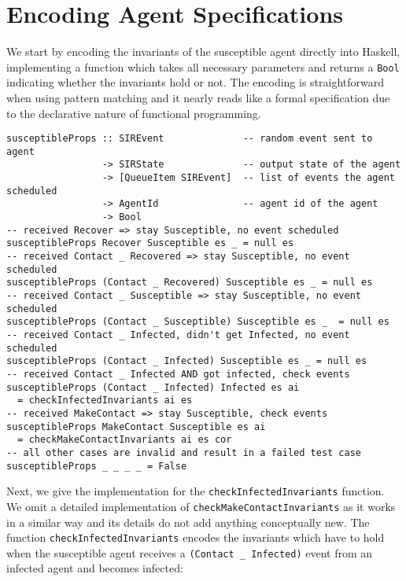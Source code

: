 \section{Encoding Agent Specifications}
\label{sec:method}
We start by encoding the invariants of the susceptible agent directly into Haskell, implementing a function which takes all necessary parameters and returns a \texttt{Bool} indicating whether the invariants hold or not. The encoding is straightforward when using pattern matching and it nearly reads like a formal specification due to the declarative nature of functional programming.

\begin{footnotesize}
\begin{verbatim}
susceptibleProps :: SIREvent              -- random event sent to agent
                 -> SIRState              -- output state of the agent
                 -> [QueueItem SIREvent]  -- list of events the agent scheduled
                 -> AgentId               -- agent id of the agent
                 -> Bool
-- received Recover => stay Susceptible, no event scheduled
susceptibleProps Recover Susceptible es _ = null es
-- received Contact _ Recovered => stay Susceptible, no event scheduled
susceptibleProps (Contact _ Recovered) Susceptible es _ = null es
-- received Contact _ Susceptible => stay Susceptible, no event scheduled
susceptibleProps (Contact _ Susceptible) Susceptible es _  = null es
-- received Contact _ Infected, didn't get Infected, no event scheduled
susceptibleProps (Contact _ Infected) Susceptible es _ = null es
-- received Contact _ Infected AND got infected, check events
susceptibleProps (Contact _ Infected) Infected es ai
  = checkInfectedInvariants ai es
-- received MakeContact => stay Susceptible, check events
susceptibleProps MakeContact Susceptible es ai
  = checkMakeContactInvariants ai es cor
-- all other cases are invalid and result in a failed test case
susceptibleProps _ _ _ _ = False
\end{verbatim}
\end{footnotesize}

Next, we give the implementation for the \texttt{checkInfectedInvariants} function. We omit a detailed implementation of \texttt{checkMakeContactInvariants} as it works in a similar way and its details do not add anything conceptually new. The function \texttt{checkInfectedInvariants} encodes the invariants which have to hold when the susceptible agent receives a \texttt{(Contact \_ Infected)} event from an infected agent and becomes infected:

